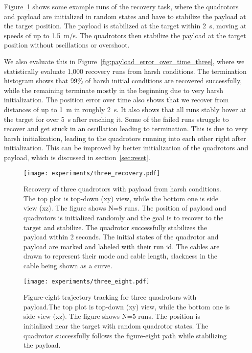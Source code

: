 Figure~\ref{fig:three_recovery} shows some example runs of the recovery task, where the quadrotors and payload are initialized in random states and have to stabilize the payload at the target position. The payload is stabilized at the target within 2~s, moving at speeds of up to 1.5~m/s. The quadrotors then stabilize the payload at the target position without oscillations or overshoot.

We also evaluate this in Figure~\ref{fig:payload_error_over_time_three}, where we statistically evaluate 1,000 recovery runs from harsh conditions. The termination histogram shows that 99\% of harsh initial conditions are recovered successfully, while the remaining terminate mostly in the beginning due to very harsh initialization. The position error over time also shows that we recover from distances of up to 1~m in roughly 2~s. It also shows that all runs stably hover at the target for over 5~s after reaching it. Some of the failed runs struggle to recover and get stuck in an oscillation leading to termination. This is due to very harsh initialization, leading to the quadrotors running into each other right after initialization. This can be improved by better initialization of the quadrotors and payload, which is discussed in section~\ref{sec:reset}.

\begin{figure}[H]
    \centering
    
    \texttt{[image: experiments/three\_recovery.pdf]}
    \caption[Three Quadrotor Harsh Recovery Trajectory]{Recovery of three quadrotors with payload from harsh conditions. The top plot is top-down  (xy) view, while the bottom one is side view (xz).
    The figure shows N=8 runs. The position of payload and quadrotors is initialized randomly and the goal is to recover to the target and stabilize. The quadrotor successfully stabilizes the payload within 2 seconds. The initial states of the quadrotor and payload are marked and labeled with their run id. The cables are drawn to represent their mode and cable length, slackness in the cable being shown as a curve.}
    \label{fig:three_recovery}
\end{figure}
\begin{figure}[H]
    \centering
    
    \texttt{[image: experiments/three\_eight.pdf]}
    \caption[Three Quadrotor Figure-Eight Tracking]{Figure-eight trajectory tracking for three quadrotors with payload.The top plot is top-down  (xy) view, while the bottom one is side view (xz). The figure shows N=5 runs. The position is initialized near the target with random quadrotor states. The quadrotor successfully follows the figure-eight path while stabilizing the payload.}
    \label{fig:three_eight}
\end{figure}


